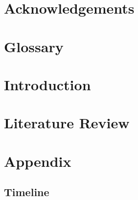 \documentclass[oneside, 12pt]{book}
\begin{document}
    \chapter{Acknowledgements}
        
    \chapter{Glossary}
        

\mainmatter
    \chapter{Introduction}
        
        
    \chapter{Literature Review}
    
    
    \chapter{Appendix}
        \section{Timeline}
        
        
            

    
    
\end{document}
